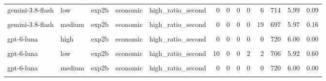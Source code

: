\documentclass[
]{article}
\begin{document}
\begin{table}[!h]
{\begin{tabular}[t]{lllllrrrrrrrr}
gemini-3.8-flash & low & exp2b & economic & high\_ratio\_second & 0 & 0 & 0 & 0 & 6 & 714 & 5.99 & 0.09\\
\cellcolor{gray!10}{gemini-3.8-flash} & \cellcolor{gray!10}{medium} & \cellcolor{gray!10}{exp2b} & \cellcolor{gray!10}{economic} & \cellcolor{gray!10}{high\_ratio\_first} & \cellcolor{gray!10}{0} & \cellcolor{gray!10}{0} & \cellcolor{gray!10}{0} & \cellcolor{gray!10}{0} & \cellcolor{gray!10}{35} & \cellcolor{gray!10}{685} & \cellcolor{gray!10}{5.95} & \cellcolor{gray!10}{0.22}\\
gemini-3.8-flash & medium & exp2b & economic & high\_ratio\_second & 0 & 0 & 0 & 0 & 19 & 697 & 5.97 & 0.16\\
\addlinespace
\cellcolor{gray!10}{gpt-6-luna} & \cellcolor{gray!10}{high} & \cellcolor{gray!10}{exp2b} & \cellcolor{gray!10}{economic} & \cellcolor{gray!10}{high\_ratio\_first} & \cellcolor{gray!10}{0} & \cellcolor{gray!10}{0} & \cellcolor{gray!10}{0} & \cellcolor{gray!10}{0} & \cellcolor{gray!10}{0} & \cellcolor{gray!10}{720} & \cellcolor{gray!10}{6.00} & \cellcolor{gray!10}{0.00}\\
gpt-6-luna & high & exp2b & economic & high\_ratio\_second & 0 & 0 & 0 & 0 & 0 & 720 & 6.00 & 0.00\\
\cellcolor{gray!10}{gpt-6-luna} & \cellcolor{gray!10}{low} & \cellcolor{gray!10}{exp2b} & \cellcolor{gray!10}{economic} & \cellcolor{gray!10}{high\_ratio\_first} & \cellcolor{gray!10}{16} & \cellcolor{gray!10}{0} & \cellcolor{gray!10}{0} & \cellcolor{gray!10}{3} & \cellcolor{gray!10}{2} & \cellcolor{gray!10}{699} & \cellcolor{gray!10}{5.88} & \cellcolor{gray!10}{0.75}\\
gpt-6-luna & low & exp2b & economic & high\_ratio\_second & 10 & 0 & 0 & 2 & 2 & 706 & 5.92 & 0.60\\
\cellcolor{gray!10}{gpt-6-luna} & \cellcolor{gray!10}{medium} & \cellcolor{gray!10}{exp2b} & \cellcolor{gray!10}{economic} & \cellcolor{gray!10}{high\_ratio\_first} & \cellcolor{gray!10}{1} & \cellcolor{gray!10}{0} & \cellcolor{gray!10}{0} & \cellcolor{gray!10}{0} & \cellcolor{gray!10}{0} & \cellcolor{gray!10}{719} & \cellcolor{gray!10}{5.99} & \cellcolor{gray!10}{0.19}\\
\addlinespace
gpt-6-luna & medium & exp2b & economic & high\_ratio\_second & 0 & 0 & 0 & 0 & 0 & 720 & 6.00 & 0.00\\
\cellcolor{gray!10}{llama3.2} & \cellcolor{gray!10}{} & \cellcolor{gray!10}{exp2b} & \cellcolor{gray!10}{economic} & \cellcolor{gray!10}{high\_ratio\_first} & \cellcolor{gray!10}{1} & \cellcolor{gray!10}{123} & \cellcolor{gray!10}{180} & \cellcolor{gray!10}{157} & \cellcolor{gray!10}{172} & \cellcolor{gray!10}{87} & \cellcolor{gray!10}{3.88} & \cellcolor{gray!10}{1.29}\\

\end{tabular}}
\end{table}
\end{document}
